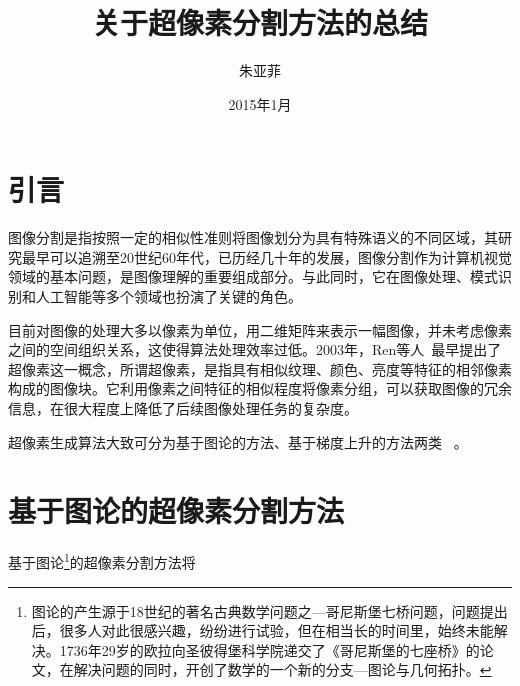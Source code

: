 \documentclass[12pt]{article}
\begin{document}
\title{\vspace{-2em}关于超像素分割方法的总结\vspace{-0.7em}}
\author{朱亚菲}
\date{\vspace{-0.7em}2015年1月\vspace{-0.7em}}
\maketitle\thispagestyle{fancy}
\maketitle
\tableofcontents 


\section{引言}

图像分割是指按照一定的相似性准则将图像划分为具有特殊语义的不同区域，其研究最早可以追溯至20世纪60年代，已历经几十年的发展，图像分割作为计算机视觉领域的基本问题，是图像理解的重要组成部分。与此同时，它在图像处理、模式识别和人工智能等多个领域也扮演了关键的角色。

目前对图像的处理大多以像素为单位，用二维矩阵来表示一幅图像，并未考虑像素之间的空间组织关系，这使得算法处理效率过低。2003年，Ren等人~\cite{1}最早提出了超像素这一概念，所谓超像素，是指具有相似纹理、颜色、亮度等特征的相邻像素构成的图像块。它利用像素之间特征的相似程度将像素分组，可以获取图像的冗余信息，在很大程度上降低了后续图像处理任务的复杂度。

超像素生成算法大致可分为基于图论的方法、基于梯度上升的方法两类~\cite{4} 。

\section{基于图论的超像素分割方法}

基于图论\footnote{图论的产生源于18世纪的著名古典数学问题之---哥尼斯堡七桥问题，问题提出后，很多人对此很感兴趣，纷纷进行试验，但在相当长的时间里，始终未能解决。1736年29岁的欧拉向圣彼得堡科学院递交了《哥尼斯堡的七座桥》的论文，在解决问题的同时，开创了数学的一个新的分支---图论与几何拓扑。}的超像素分割方法将
\end{document}
